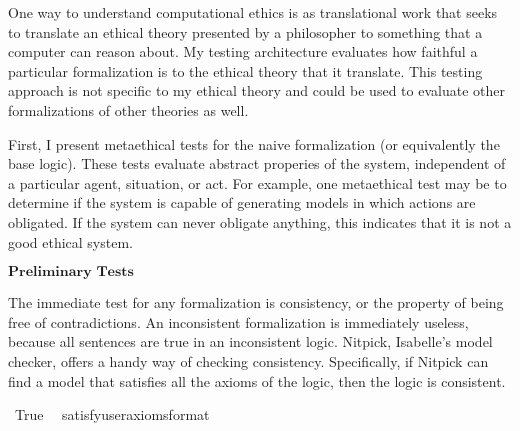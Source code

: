 \begin{isabellebody}
\begin{isamarkuptext}
One way to understand computational ethics is as translational work that seeks
to translate an ethical theory presented by a philosopher to something that a computer can reason about.
My testing architecture evaluates how faithful a particular formalization is to the ethical theory that 
it translate. This testing approach is not specific to my ethical theory and could be used to evaluate
other formalizations of other theories as well.%
\end{isamarkuptext}\isamarkuptrue%
%
\isadelimdocument
%
\endisadelimdocument
%
\isatagdocument
%
\isamarkuptrue%
%
\endisatagdocument
{\isafolddocument}%
%
\isadelimdocument
%
\endisadelimdocument
%
\begin{isamarkuptext}%
First, I present metaethical tests for the naive formalization (or equivalently the base logic). 
These tests evaluate abstract properies of the system, independent of a particular agent, situation, or 
act. For example, one metaethical test may be to determine if the system is capable of generating models 
in which actions are obligated. If the system can never obligate anything, this indicates that it is 
not a good ethical system.%
\end{isamarkuptext}\isamarkuptrue%
%
\begin{isamarkuptext}%
$\textbf{Preliminary Tests}$%
\end{isamarkuptext}\isamarkuptrue%
%
\begin{isamarkuptext}%
The immediate test for any formalization is consistency, or the property of being free of contradictions. 
An inconsistent formalization is immediately useless, because all sentences are true in an inconsistent
logic. Nitpick, Isabelle's model checker, offers a handy way of checking consistency. Specifically, 
if Nitpick can find a model that satisfies all the axioms of the logic, then the logic is consistent.%
\end{isamarkuptext}\isamarkuptrue%
\isamarkupfalse%
\ True\ \isamarkupfalse%
\ {\isacharbrackleft}satisfy{\isacharcomma}user{\isacharunderscore}axioms{\isacharcomma}format{\isacharequal}{}{\isacharbrackright}%
\isadelimproof
\ %
\endisadelimproof
%
\isatagproof
{}\isamarkupfalse%
\isanewline
%
\end{isabellebody}
